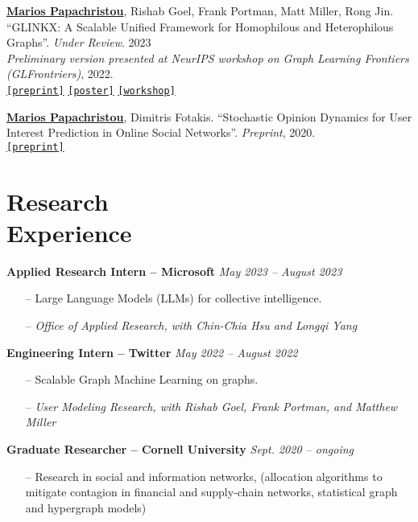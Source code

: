 \documentclass[margin]{res}
\newcommand{\specialurl}[2]{\href {#2} {\texttt{[#1]}}}
\newcommand{\preprint}[1]{\specialurl {preprint} {#1}}
\newcommand{\poster}[1]{\specialurl {poster} {#1}}
\newcommand{\workshop}[1]{\specialurl {workshop} {#1}}
\newcommand{\authorref}[1]{\underline {\textbf{#1}}}
\newcommand{\authorme}{\authorref{Marios Papachristou}}
\begin{document}
\begin{resume}
\begin{enumerate}[nosep, label={[W\arabic*]}]
   \item \authorme, Rishab Goel, Frank Portman, Matt Miller, Rong Jin. ``GLINKX: A Scalable Unified Framework for Homophilous and Heterophilous Graphs''. \emph{Under Review}. 2023 \\\emph{Preliminary version presented at NeurIPS workshop on Graph Learning Frontiers (GLFrontriers)}, 2022. \\ \preprint{https://arxiv.org/abs/2211.00550} \poster{https://drive.google.com/file/d/14LwkvoH7sUe6qGvINGqTuMSHid16J3Av/view?usp=share_link} \workshop{https://openreview.net/forum?id=GlViaJSwnlK}
    \item \authorme, Dimitris Fotakis. ``Stochastic Opinion Dynamics for User Interest Prediction in Online Social Networks''.  \emph{Preprint}, 2020. \\ \preprint{https://www.researchgate.net/publication/353006940_Stochastic_Opinion_Dynamics_for_Interest_Prediction_in_Social_Networks}
\end{enumerate}


\section{Research \\ Experience}

 \textbf{Applied Research Intern -- Microsoft} \hfill \emph{May 2023 -- August 2023}

\begin{itemize}[nosep]
	\item[--] Large Language Models (LLMs) for collective intelligence. 	
	\item[--] \emph{Office of Applied Research, with Chin-Chia Hsu and Longqi Yang}
\end{itemize}


\textbf{Engineering Intern -- Twitter} \hfill \emph{May 2022 -- August 2022}
\begin{itemize}[nosep]
\item[--] Scalable Graph Machine Learning on graphs. 
\item[--] \emph{User Modeling Research, with Rishab Goel, Frank Portman, and Matthew Miller}
\end{itemize}

\textbf{Graduate Researcher -- Cornell University} \hfill \emph{Sept. 2020 -- ongoing}
\begin{itemize}[nosep]
	\item[--] Research in social and information networks, (allocation algorithms to mitigate contagion in financial and supply-chain networks, statistical graph and hypergraph models)
\end{itemize}



\end{resume}
\end{document}
